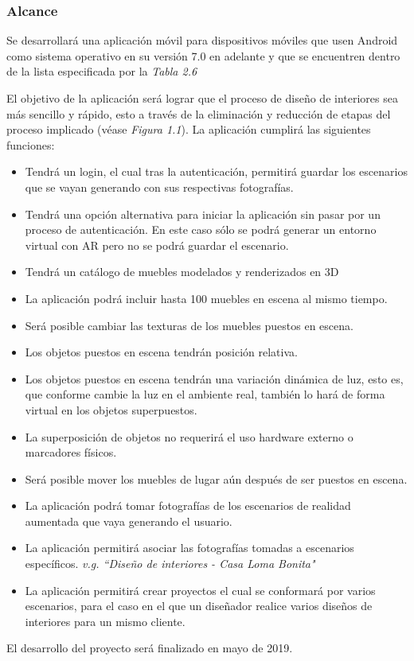 \subsubsection{Alcance}
Se desarrollará una aplicación móvil para dispositivos móviles que usen Android como sistema operativo en su versión 7.0 en adelante y que se encuentren dentro de la lista especificada por la \textit{Tabla 2.6}\par
El objetivo de la aplicación será lograr que el proceso de diseño de interiores sea más sencillo y rápido, esto a través de la eliminación y reducción de etapas del proceso implicado (véase \textit{Figura 1.1}).
La aplicación cumplirá las siguientes funciones:\par
\begin{itemize}
	\item Tendrá un login, el cual tras la autenticación, permitirá guardar los escenarios que se vayan generando con sus respectivas fotografías.
	\item Tendrá una opción alternativa para iniciar la aplicación sin pasar por un proceso de autenticación. En este caso sólo se podrá generar un entorno virtual con AR pero no se podrá guardar el escenario.
	\item Tendrá un catálogo de muebles modelados y renderizados en 3D
	\item La aplicación podrá incluir hasta 100 muebles en escena al mismo tiempo.
	\item Será posible cambiar las texturas de los muebles puestos en escena.
	\item Los objetos puestos en escena tendrán posición relativa.
	\item Los objetos puestos en escena tendrán una variación dinámica de luz, esto es, que conforme cambie la luz en el ambiente real, también lo hará de forma virtual en los objetos superpuestos.
	\item La superposición de objetos no requerirá el uso hardware externo o marcadores físicos.
	\item Será posible mover los muebles de lugar aún después de ser puestos en escena.
	\item La aplicación podrá tomar fotografías de los escenarios de realidad aumentada que vaya generando el usuario.
	\item La aplicación permitirá asociar las fotografías tomadas a escenarios específicos. \textit{v.g. ``Diseño de interiores - Casa Loma Bonita"}
	\item La aplicación permitirá crear proyectos el cual se conformará por varios escenarios, para el caso en el que un diseñador realice varios diseños de interiores para un mismo cliente.
\end{itemize}
\noindent
El desarrollo del proyecto será finalizado en mayo de 2019.
